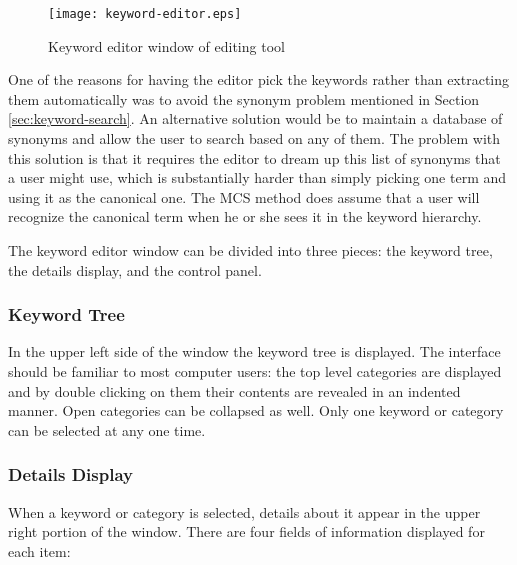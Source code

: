 \begin{figure}[htbp]
  \centering
  \texttt{[image: keyword-editor.eps]}
  \caption{Keyword editor window of editing tool}
  \label{fig:keyword-editor}
\end{figure}

One of the reasons for having the editor pick the keywords rather than
extracting them automatically was to avoid the synonym problem mentioned in
Section \ref{sec:keyword-search}. An alternative solution would be to maintain
a database of synonyms and allow the user to search based on any of them. The
problem with this solution is that it requires the editor to dream up this list
of synonyms that a user might use, which is substantially harder than simply
picking one term and using it as the canonical one. The MCS method does assume
that a user will recognize the canonical term when he or she sees it in the
keyword hierarchy.

The keyword editor window can be divided into three pieces: the keyword tree,
the details display, and the control panel.

\subsubsection{Keyword Tree}
In the upper left side of the window the keyword tree is displayed. The
interface should be familiar to most computer users: the top level categories
are displayed and by double clicking on them their contents are revealed in an
indented manner. Open categories can be collapsed as well. Only one keyword or
category can be selected at any one time.

\subsubsection{Details Display}
When a keyword or category is selected, details about it appear in the upper
right portion of the window. There are four fields of information displayed for
each item:

